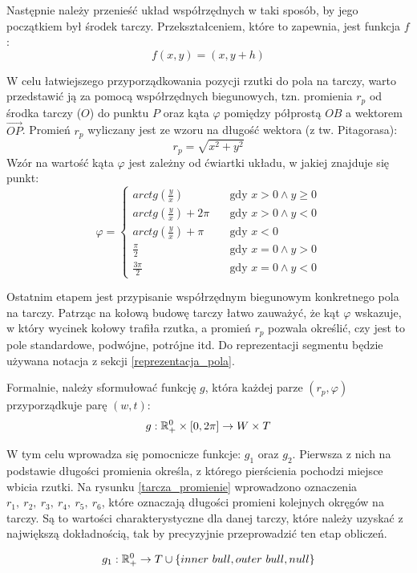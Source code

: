 Następnie należy przenieść układ współrzędnych w taki sposób, by jego początkiem był środek tarczy. Przekształceniem, które to zapewnia, jest funkcja $f$:
\[
f(x, y) = (x, y + h)
\]

W celu łatwiejszego przyporządkowania pozycji rzutki do pola na tarczy, warto przedstawić ją za pomocą współrzędnych biegunowych, tzn. promienia $r_p$ od środka tarczy ($O$) do punktu $P$ oraz kąta $\varphi$ pomiędzy półprostą $OB$ a wektorem $\overrightarrow{OP}$. \newline
Promień $r_p$ wyliczany jest ze wzoru na długość wektora (z tw. Pitagorasa):
\[
r_p = \sqrt{x^2 + y^2}
\]
Wzór na wartość kąta $\varphi$ jest zależny od ćwiartki układu, w jakiej znajduje się punkt:
\[
\varphi = 
     \begin{cases}
       arctg(\frac{y}{x}) &\quad\text{gdy } x > 0 \land y \ge 0 \\
       arctg(\frac{y}{x}) + 2\pi &\quad\text{gdy } x > 0 \land y < 0 \\
       arctg(\frac{y}{x})+ \pi &\quad\text{gdy } x < 0 \\
       \frac{\pi}{2} &\quad\text{gdy } x = 0 \land y > 0 \\ 
       \frac{3\pi}{2} &\quad\text{gdy } x = 0 \land y < 0
     \end{cases}
\]

Ostatnim etapem jest przypisanie współrzędnym biegunowym konkretnego pola na tarczy. Patrząc na kołową budowę tarczy łatwo zauważyć, że kąt $\varphi$ wskazuje, w który wycinek kołowy trafiła rzutka, a promień $r_p$ pozwala określić, czy jest to pole standardowe, podwójne, potrójne itd. Do reprezentacji segmentu będzie używana notacja z sekcji \ref{reprezentacja_pola}.

Formalnie, należy sformułować funkcję $g$, która każdej parze $(r_p, \varphi)$ przyporządkuje parę $(w, t)$:
\[
g: \mathbb{R}^0_+ \times [0, 2\pi] \to W \times T
\]

W tym celu wprowadza się pomocnicze funkcje: $g_1$ oraz $g_2$. Pierwsza z nich na podstawie długości promienia określa, z którego pierścienia pochodzi miejsce wbicia rzutki. Na rysunku \ref{tarcza_promienie} wprowadzono oznaczenia $r_1,\ r_2,\ r_3,\ r_4,\ r_5,\ r_6$, które oznaczają długości promieni kolejnych okręgów na tarczy. Są to wartości charakterystyczne dla danej tarczy, które należy uzyskać z największą dokładnością, tak by precyzyjnie przeprowadzić ten etap obliczeń. 

\[
g_1: \mathbb{R}^0_+ \to T \cup \{inner\ bull, outer\ bull, null \}
\]

